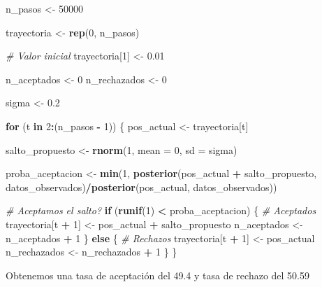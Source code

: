 \documentclass[
  12pt,
]{book}
\newenvironment{Shaded}{\begin{snugshade}}{\end{snugshade}}
\newcommand{\CommentTok}[1]{\textcolor[rgb]{0.56,0.35,0.01}{\textit{#1}}}
\newcommand{\ControlFlowTok}[1]{\textcolor[rgb]{0.13,0.29,0.53}{\textbf{#1}}}
\newcommand{\DataTypeTok}[1]{\textcolor[rgb]{0.13,0.29,0.53}{#1}}
\newcommand{\DecValTok}[1]{\textcolor[rgb]{0.00,0.00,0.81}{#1}}
\newcommand{\FloatTok}[1]{\textcolor[rgb]{0.00,0.00,0.81}{#1}}
\newcommand{\KeywordTok}[1]{\textcolor[rgb]{0.13,0.29,0.53}{\textbf{#1}}}
\newcommand{\NormalTok}[1]{#1}
\newcommand{\OperatorTok}[1]{\textcolor[rgb]{0.81,0.36,0.00}{\textbf{#1}}}
\newcommand{\StringTok}[1]{\textcolor[rgb]{0.31,0.60,0.02}{#1}}
\theoremstyle{definition}
\theoremstyle{definition}
\theoremstyle{definition}
\theoremstyle{remark}
\begin{document}
\begin{Shaded}
\begin{Highlighting}[]
\NormalTok{n_pasos <-}\StringTok{ }\DecValTok{50000}

\NormalTok{trayectoria <-}\StringTok{ }\KeywordTok{rep}\NormalTok{(}\DecValTok{0}\NormalTok{, n_pasos)}

\CommentTok{# Valor inicial}
\NormalTok{trayectoria[}\DecValTok{1}\NormalTok{] <-}\StringTok{ }\FloatTok{0.01}

\NormalTok{n_aceptados <-}\StringTok{ }\DecValTok{0}
\NormalTok{n_rechazados <-}\StringTok{ }\DecValTok{0}


\NormalTok{sigma <-}\StringTok{ }\FloatTok{0.2}

\ControlFlowTok{for}\NormalTok{ (t }\ControlFlowTok{in} \DecValTok{2}\OperatorTok{:}\NormalTok{(n_pasos }\OperatorTok{-}\StringTok{ }\DecValTok{1}\NormalTok{)) \{}
\NormalTok{    pos_actual <-}\StringTok{ }\NormalTok{trayectoria[t]}
    
\NormalTok{    salto_propuesto <-}\StringTok{ }\KeywordTok{rnorm}\NormalTok{(}\DecValTok{1}\NormalTok{, }\DataTypeTok{mean =} \DecValTok{0}\NormalTok{, }\DataTypeTok{sd =}\NormalTok{ sigma)}
    
\NormalTok{    proba_aceptacion <-}\StringTok{ }\KeywordTok{min}\NormalTok{(}\DecValTok{1}\NormalTok{, }\KeywordTok{posterior}\NormalTok{(pos_actual }\OperatorTok{+}\StringTok{ }
\StringTok{        }\NormalTok{salto_propuesto, datos_observados)}\OperatorTok{/}\KeywordTok{posterior}\NormalTok{(pos_actual, }
\NormalTok{        datos_observados))}
    
    \CommentTok{# Aceptamos el salto?}
    \ControlFlowTok{if}\NormalTok{ (}\KeywordTok{runif}\NormalTok{(}\DecValTok{1}\NormalTok{) }\OperatorTok{<}\StringTok{ }\NormalTok{proba_aceptacion) \{}
        \CommentTok{# Aceptados}
\NormalTok{        trayectoria[t }\OperatorTok{+}\StringTok{ }\DecValTok{1}\NormalTok{] <-}\StringTok{ }\NormalTok{pos_actual }\OperatorTok{+}\StringTok{ }\NormalTok{salto_propuesto}
\NormalTok{        n_aceptados <-}\StringTok{ }\NormalTok{n_aceptados }\OperatorTok{+}\StringTok{ }\DecValTok{1}
\NormalTok{    \} }\ControlFlowTok{else}\NormalTok{ \{}
        \CommentTok{# Rechazos}
\NormalTok{        trayectoria[t }\OperatorTok{+}\StringTok{ }\DecValTok{1}\NormalTok{] <-}\StringTok{ }\NormalTok{pos_actual}
\NormalTok{        n_rechazados <-}\StringTok{ }\NormalTok{n_rechazados }\OperatorTok{+}\StringTok{ }\DecValTok{1}
\NormalTok{    \}}
\NormalTok{\}}
\end{Highlighting}
\end{Shaded}

Obtenemos una tasa de aceptación del 49.4 y tasa de rechazo del 50.59
\end{document}
